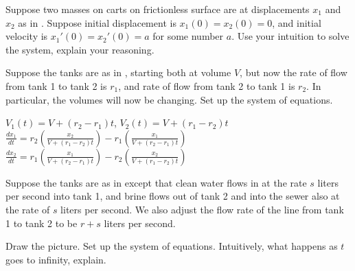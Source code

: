 \begin{exercise}\ansMark%
Suppose two masses on carts on frictionless surface are at 
displacements $x_1$ and $x_2$ as in .
Suppose initial displacement is $x_1(0)=x_2(0)=0$, and initial velocity is $x_1'(0) = x_2'(0) = a$ for some number $a$.
Use your intuition
to solve the system, explain your reasoning.
\end{exercise}

\begin{exercise}
Suppose the tanks are as in 
, starting both at volume $V$,
but now the rate of flow from tank 1 to tank 2 is $r_1$, and
rate of flow from tank 2 to tank 1 is $r_2$.  In particular,
the volumes will now be changing.  Set up the system of equations.
\end{exercise}
\comboSol{%
}
{%
$V_1(t) = V + (r_2 - r_1)t$, $V_2(t) = V + (r_1 - r_2)t$ \\
$\frac{dx_1}{dt} = r_2\left(\frac{x_2}{V + (r_1 - r_2)t}\right)  - r_1\left(\frac{x_1}{V + (r_2 - r_1)t}\right)$ \quad
$\frac{dx_2}{dt} = r_1\left(\frac{x_1}{V + (r_2 - r_1)t}\right)  - r_2\left(\frac{x_2}{V + (r_1 - r_2)t}\right)$ \\
}

\begin{exercise}\ansMark%
Suppose the tanks are as in 
 except that clean water flows in
at the rate $s$ liters per second into tank 1, and brine flows out of tank 2
and into the sewer also at the rate of $s$ liters per second. We also adjust the flow rate of the line from tank 1 to tank 2 to be $r+s$ liters per second.
\begin{tasks}
\task Draw the picture.
\task Set up the system of equations.
\task Intuitively, what happens as $t$ goes to infinity, explain.
\end{tasks}
\end{exercise}

